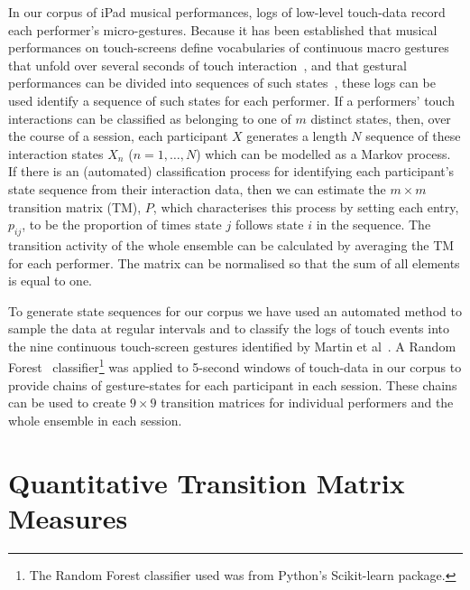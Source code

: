 \documentclass{sigchi}
\begin{document}
In our corpus of iPad musical performances, logs of low-level touch-data record each performer's micro-gestures. 
Because it has been
established that musical performances on touch-screens define  
vocabularies of continuous macro gestures that unfold over
several seconds of touch interaction~\cite{Martin:2014cr}, and that
gestural performances can be divided into sequences of such states~\cite{Pressing:1988uo}, these logs
 can be used identify a sequence of such states for each performer.
If a performers' touch interactions can be classified as belonging
to one of $m$ distinct states, then, over the course of a session, each
participant $X$ generates a length $N$ sequence of these interaction
states $X_n$ ($n = 1, \ldots, N$) which can be modelled as a Markov
process.
If there is an (automated) classification process for identifying each
participant's state sequence from their interaction data, then we can
estimate the $m \times m$ transition matrix (TM), $P$, which characterises
this process by setting each entry, $p_{ij}$, to be the proportion of times
state $j$ follows state $i$ in the sequence. The transition activity
of the whole ensemble can be calculated by averaging the TM for each
performer. The matrix can be normalised so that the sum of all
elements is equal to one.

To generate state sequences for our corpus we have used an automated
method to sample the data at regular intervals and to classify the logs of touch events
into the nine continuous touch-screen gestures identified by Martin et
al~\cite{Martin:2015jk}. A Random Forest~\cite{Breiman:2001kx}
classifier\footnote{The Random Forest classifier used was from
  Python's Scikit-learn package\cite{scikit-learn}.} was applied to
5-second windows of touch-data in our corpus to provide chains of
gesture-states for each participant in each session. These chains can
be used to create $9 \times 9$ transition matrices for individual
performers and the whole ensemble in each session.

\section{Quantitative Transition Matrix Measures}
\label{sec:underst-impr-group}
\end{document}
